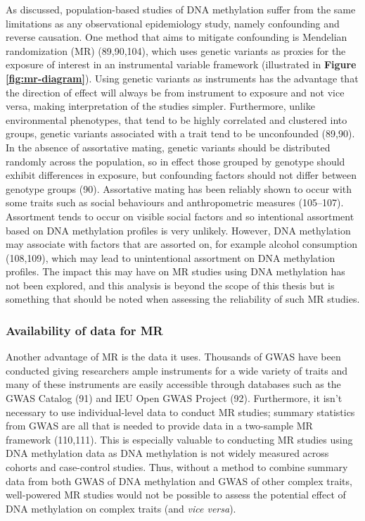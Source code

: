 \documentclass[11pt,oneside]{bristolthesis}
\begin{document}
As discussed, population-based studies of DNA methylation suffer from the same limitations as any observational epidemiology study, namely confounding and reverse causation. One method that aims to mitigate confounding is Mendelian randomization (MR) (89,90,104), which uses genetic variants as proxies for the exposure of interest in an instrumental variable framework (illustrated in \textbf{Figure \ref{fig:mr-diagram}}). Using genetic variants as instruments has the advantage that the direction of effect will always be from instrument to exposure and not vice versa, making interpretation of the studies simpler. Furthermore, unlike environmental phenotypes, that tend to be highly correlated and clustered into groups, genetic variants associated with a trait tend to be unconfounded (89,90). In the absence of assortative mating, genetic variants should be distributed randomly across the population, so in effect those grouped by genotype should exhibit differences in exposure, but confounding factors should not differ between genotype groups (90). Assortative mating has been reliably shown to occur with some traits such as social behaviours and anthropometric measures (105--107). Assortment tends to occur on visible social factors and so intentional assortment based on DNA methylation profiles is very unlikely. However, DNA methylation may associate with factors that are assorted on, for example alcohol consumption (108,109), which may lead to unintentional assortment on DNA methylation profiles. The impact this may have on MR studies using DNA methylation has not been explored, and this analysis is beyond the scope of this thesis but is something that should be noted when assessing the reliability of such MR studies.

\hypertarget{availability-of-data-for-mr}{%
\subsubsection{Availability of data for MR}\label{availability-of-data-for-mr}}

Another advantage of MR is the data it uses. Thousands of GWAS have been conducted giving researchers ample instruments for a wide variety of traits and many of these instruments are easily accessible through databases such as the GWAS Catalog (91) and IEU Open GWAS Project (92). Furthermore, it isn't necessary to use individual-level data to conduct MR studies; summary statistics from GWAS are all that is needed to provide data in a two-sample MR framework (110,111). This is especially valuable to conducting MR studies using DNA methylation data as DNA methylation is not widely measured across cohorts and case-control studies. Thus, without a method to combine summary data from both GWAS of DNA methylation and GWAS of other complex traits, well-powered MR studies would not be possible to assess the potential effect of DNA methylation on complex traits (and \emph{vice versa}).
\end{document}
